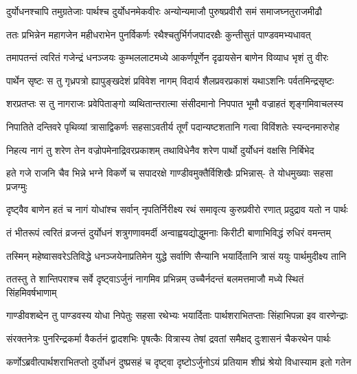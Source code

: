 \fourlineindentedshloka
{दुर्योधनश्चापि तमुग्रतेजाः}
{पार्थश्च दुर्योधनमेकवीरः}
{अन्योन्यमाजौ पुरुषप्रवीरौ}
{समं समाजघ्नतुराजमीढौ}


\fourlineindentedshloka
{ततः प्रभिन्नेन महागजेन}
{महीधराभेन पुनर्विकर्णः}
{रथैश्चतुर्भिर्गजपादरक्षैः}
{कुन्तीसुतं पाण्डवमभ्यधावत्}


\fourlineindentedshloka
{तमापतन्तं त्वरितं गजेन्द्रं}
{धनञ्जयः कुम्भललाटमध्ये}
{आकर्णपूर्णेन दृढायसेन}
{बाणेन विव्याध भृशं तु वीरः}


\fourlineindentedshloka
{पार्थेन सृष्टः स तु गृध्रपत्रो}
{ह्यापुङ्खदेशं प्रविवेश नागम्}
{विदार्य शैलप्रवरप्रकाशं}
{यथाऽशनिः पर्वतमिन्द्रसृष्टः}


\fourlineindentedshloka
{शरप्रतप्तः स तु नागराजः}
{प्रवेपिताङ्गो व्यथितान्तरात्मा}
{संसीदमानो निपपात भूमौ}
{वज्राहतं शृङ्गमिवाचलस्य}


\fourlineindentedshloka
{निपातिते दन्तिवरे पृथिव्यां}
{त्रासाद्विकर्णः सहसाऽवतीर्य}
{तूर्णं पदान्यष्टशतानि गत्वा}
{विविंशतेः स्यन्दनमारुरोह}


\fourlineindentedshloka
{निहत्य नागं तु शरेण तेन}
{वज्रोपमेनाद्रिवरप्रकाशम्}
{तथाविधेनैव शरेण पार्थो}
{दुर्योधनं वक्षसि निर्बिभेद}


\fourlineindentedshloka
{हते गजे राजनि चैव भिन्ने}
{भग्ने विकर्णे च सपादरक्षे}
{गाण्डीवमुक्तैर्विशिखैः प्रभिन्नास्-}
{ते योधमुख्याः सहसा प्रजग्मुः}


\fourlineindentedshloka
{दृष्ट्वैव बाणेन हतं च नागं}
{योधांश्च सर्वान् नृपतिर्निरीक्ष्य}
{रथं समावृत्य कुरुप्रवीरो}
{रणात् प्रदुद्राव यतो न पार्थः}


\fourlineindentedshloka
{तं भीतरूपं त्वरितं व्रजन्तं}
{दुर्योधनं शत्रुगणावमर्दी}
{अन्वाह्वयद्योद्धुमनाः किरीटी}
{बाणाभिविद्धं रुधिरं वमन्तम्}


\fourlineindentedshloka
{तस्मिन् महेष्वासवरेऽतिविद्धे}
{धनञ्जयेनाप्रतिमेन युद्धे}
{सर्वाणि सैन्यानि भयार्दितानि}
{त्रासं ययुः पार्थमुदीक्ष्य तानि}


\fourlineindentedshloka
{ततस्तु ते शान्तिपराश्च सर्वे}
{दृष्ट्वाऽर्जुनं नागमिव प्रभिन्नम्}
{उच्चैर्नदन्तं बलमत्तमाजौ}
{मध्ये स्थितं सिंहमिवर्षभाणाम्}


\fourlineindentedshloka
{गाण्डीवशब्देन तु पाण्डवस्य}
{योधा निपेतुः सहसा रथेभ्यः}
{भयार्दिताः पार्थशराभितप्ताः}
{सिंहाभिपन्ना इव वारणेन्द्राः}


\fourlineindentedshloka
{संरक्तनेत्रः पुनरिन्द्रकर्मा}
{वैकर्तनं द्वादशभिः पृषत्कैः}
{वित्रास्य तेषां द्रवतां समैक्षद्}
{दुःशासनं चैकरथेन पार्थः}


\fourlineindentedshloka
{कर्णोऽब्रवीत्पार्थशराभितप्तो}
{दुर्योधनं दुष्प्रसहं च दृष्ट्वा}
{दृष्टोऽर्जुनोऽयं प्रतियाम शीघ्रं}
{श्रेयो विधास्याम इतो गतेन}


